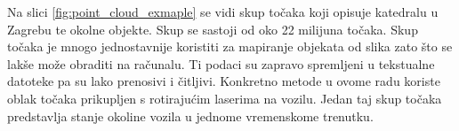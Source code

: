 Na slici \ref{fig:point_cloud_exmaple} se vidi skup točaka koji opisuje katedralu u Zagrebu te okolne objekte. Skup se sastoji od oko 22 milijuna točaka. Skup točaka je mnogo jednostavnije koristiti za mapiranje objekata od slika zato što se lakše može obraditi na računalu. Ti podaci su zapravo spremljeni u tekstualne datoteke pa su lako prenosivi i čitljivi. Konkretno metode u ovome radu koriste oblak točaka prikupljen s rotirajućim laserima na vozilu. Jedan taj skup točaka predstavlja stanje okoline vozila u jednome vremenskome trenutku.
\pagebreak